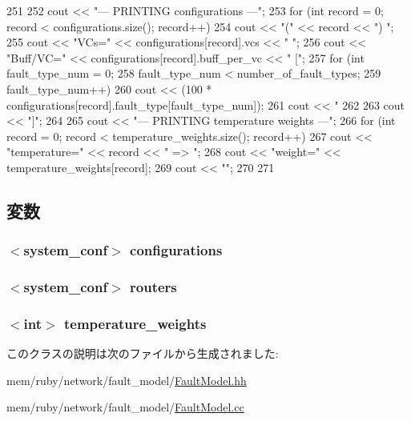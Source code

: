 \begin{DoxyCode}
251 {
252     cout << "--- PRINTING configurations ---\n";
253     for (int record = 0; record < configurations.size(); record++){
254         cout << "(" << record << ") ";
255         cout << "VCs=" << configurations[record].vcs << " ";
256         cout << "Buff/VC=" << configurations[record].buff_per_vc << " [";
257         for (int fault_type_num = 0; 
258              fault_type_num < number_of_fault_types; 
259              fault_type_num++){
260             cout << (100 * configurations[record].fault_type[fault_type_num]); 
261             cout << "%
262         }
263         cout << "]\n";
264     }
265     cout << "--- PRINTING temperature weights ---\n";
266     for (int record = 0; record < temperature_weights.size(); record++){
267         cout << "temperature=" << record << " => ";
268         cout << "weight=" << temperature_weights[record];
269         cout << "\n";
270     }
271 }
\end{DoxyCode}


\subsection{変数}
\hypertarget{classFaultModel_aa04aa52748b59c0c6e94daec54d0b10e}{
\subsubsection[{configurations}]{$<${\bf system\_\-conf}$>$ {\bf configurations}}}
\label{classFaultModel_aa04aa52748b59c0c6e94daec54d0b10e}
\hypertarget{classFaultModel_a3f1d61888ea857f30c7c8767847c2483}{
\subsubsection[{routers}]{$<${\bf system\_\-conf}$>$ {\bf routers}}}
\label{classFaultModel_a3f1d61888ea857f30c7c8767847c2483}
\hypertarget{classFaultModel_ada85c55ffa43379d698989a8ee5c0391}{
\subsubsection[{temperature\_\-weights}]{$<$int$>$ {\bf temperature\_\-weights}}}
\label{classFaultModel_ada85c55ffa43379d698989a8ee5c0391}


このクラスの説明は次のファイルから生成されました:\begin{DoxyCompactItemize}
\item 
mem/ruby/network/fault\_\-model/\hyperlink{FaultModel_8hh}{FaultModel.hh}\item 
mem/ruby/network/fault\_\-model/\hyperlink{FaultModel_8cc}{FaultModel.cc}\end{DoxyCompactItemize}
